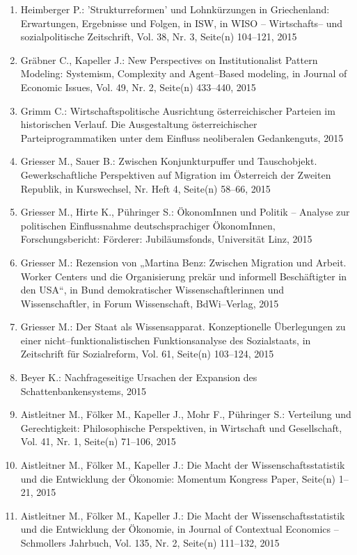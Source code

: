 \begin{enumerate}
	 \item Heimberger P.: 'Strukturreformen' und Lohnkürzungen in Griechenland: Erwartungen, Ergebnisse und Folgen, in ISW, in WISO -- Wirtschafts-- und sozialpolitische Zeitschrift, Vol. 38, Nr. 3, Seite(n) 104--121, 2015
	 \item Gräbner C., Kapeller J.: New Perspectives on  Institutionalist Pattern Modeling: Systemism, Complexity and  Agent--Based modeling, in Journal of Economic Issues, Vol. 49, Nr. 2, Seite(n) 433--440, 2015
	 \item Grimm C.: Wirtschaftspolitische Ausrichtung österreichischer Parteien im historischen Verlauf. Die Ausgestaltung österreichischer Parteiprogrammatiken unter dem Einfluss neoliberalen Gedankenguts, 2015
	 \item Griesser M., Sauer B.: Zwischen Konjunkturpuffer und Tauschobjekt. Gewerkschaftliche Perspektiven auf Migration im Österreich der Zweiten Republik, in Kurswechsel, Nr. Heft 4, Seite(n) 58--66, 2015
	 \item Griesser M., Hirte K., Pühringer S.: ÖkonomInnen und Politik – Analyse zur politischen Einflussnahme deutschsprachiger ÖkonomInnen, Forschungsbericht: Förderer: Jubiläumsfonds, Universität Linz, 2015
	 \item Griesser M.: Rezension von „Martina Benz: Zwischen Migration und Arbeit. Worker Centers und die Organisierung prekär und informell Beschäftigter in den USA“, in Bund demokratischer Wissenschaftlerinnen und Wissenschaftler, in Forum Wissenschaft, BdWi--Verlag, 2015
	 \item Griesser M.: Der Staat als Wissensapparat. Konzeptionelle Überlegungen zu einer nicht--funktionalistischen Funktionsanalyse des Sozialstaats, in Zeitschrift für Sozialreform, Vol. 61, Seite(n) 103--124, 2015
	 \item Beyer K.: Nachfrageseitige Ursachen der Expansion des Schattenbankensystems, 2015
	 \item Aistleitner M., Fölker M., Kapeller J., Mohr F., Pühringer S.: Verteilung und Gerechtigkeit: Philosophische  Perspektiven, in Wirtschaft und Gesellschaft, Vol. 41, Nr. 1, Seite(n) 71--106, 2015
	 \item Aistleitner M., Fölker M., Kapeller J.: Die Macht der Wissenschaftsstatistik und die Entwicklung der Ökonomie: Momentum Kongress Paper, Seite(n) 1--21, 2015
	 \item Aistleitner M., Fölker M., Kapeller J.: Die Macht der Wissenschaftsstatistik und die Entwicklung der Ökonomie, in Journal of Contextual Economics – Schmollers Jahrbuch, Vol. 135, Nr. 2, Seite(n) 111–132, 2015
\end{enumerate}
